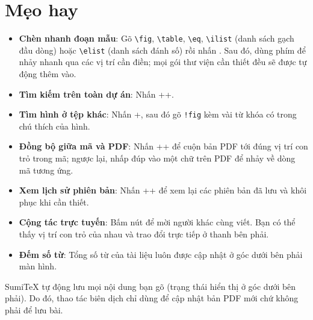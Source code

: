 \section{Mẹo hay}

\begin{itemize}
  \item \textbf{Chèn nhanh đoạn mẫu}: Gõ \texttt{\textbackslash fig},
    \texttt{\textbackslash table}, \texttt{\textbackslash eq},
    \texttt{\textbackslash ilist} (danh sách gạch đầu dòng) hoặc
    \texttt{\textbackslash elist} (danh sách đánh số) rồi nhấn .
    Sau đó, dùng phím  để nhảy nhanh qua các vị trí cần điền; mọi gói
    thư viện cần thiết đều sẽ được tự động thêm vào.
  \item \textbf{Tìm kiếm trên toàn dự án}: Nhấn ++.
  \item \textbf{Tìm hình ở tệp khác}: Nhấn +, sau đó gõ
    \texttt{!fig} kèm vài từ khóa có trong chú thích của hình.
  \item \textbf{Đồng bộ giữa mã và PDF}: Nhấn ++
    để cuộn bản PDF tới đúng vị trí con trỏ trong mã; ngược lại, nhấp đúp vào
    một chữ trên PDF để nhảy về dòng mã tương ứng.
  \item \textbf{Xem lịch sử phiên bản}: Nhấn ++
    để xem lại các phiên bản đã lưu và khôi phục khi cần thiết.
  \item \textbf{Cộng tác trực tuyến}: Bấm nút  để mời người khác
    cùng viết. Bạn có thể thấy vị trí con trỏ của nhau và trao đổi trực tiếp ở
    thanh bên phải.
  \item \textbf{Đếm số từ}: Tổng số từ của tài liệu luôn được cập nhật ở góc
    dưới bên phải màn hình.
\end{itemize}

\begin{chuy}
SumiTeX tự động lưu mọi nội dung bạn gõ (trạng thái  hiển thị ở góc
dưới bên phải). Do đó, thao tác biên dịch chỉ dùng để cập nhật bản PDF mới chứ
không phải để lưu bài.
\end{chuy}